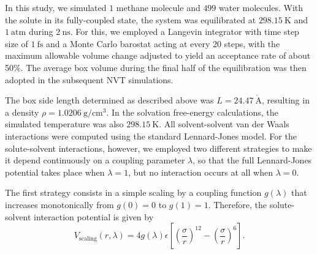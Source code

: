 \documentclass[
aip,
jcp,
reprint,
]{revtex4-1}
\renewcommand{\AA}{\mathring{A}}                       %
\begin{document}
In this study, we simulated $1$ methane molecule and $499$ water molecules.
With the solute in its fully-coupled state, the system was equilibrated at $298.15~\mathrm{K}$ and $1~\mathrm{atm}$ during $2~\mathrm{ns}$.
For this, we employed a Langevin integrator with time step size of $1~\mathrm{fs}$ and a Monte Carlo barostat \cite{Chow_1995, Aqvist_2004} acting at every 20 steps, with the maximum allowable volume change adjusted to yield an acceptance rate of about 50\%.
The average box volume during the final half of the equilibration was then adopted in the subsequent NVT simulations.

The box side length determined as described above was $L = 24.47~\mathrm{\AA}$, resulting in a density $\rho = 1.0206~\mathrm{g/cm^3}$.
In the solvation free-energy calculations, the simulated temperature was also $298.15~\mathrm{K}$.
All solvent-solvent van der Waals interactions were computed using the standard Lennard-Jones model.
For the solute-solvent interactions, however, we employed two different strategies to make it depend continuously on a coupling parameter $\lambda$, so that the full Lennard-Jones potential takes place when $\lambda = 1$, but no interaction occurs at all when $\lambda = 0$.

The first strategy consists in a simple scaling by a coupling function $g(\lambda)$ that increases monotonically from $g(0) = 0$ to $g(1) = 1$.
Therefore, the solute-solvent interaction potential is given by
\begin{equation*}
V_\mathrm{scaling}(r,\lambda) = 4 g(\lambda) \epsilon \left[\left(\frac{\sigma}{r}\right)^{12} - \left(\frac{\sigma}{r}\right)^6\right].
\end{equation*}
\end{document}
